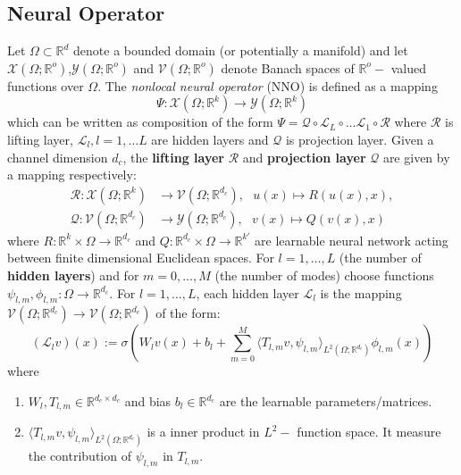 \documentclass[reqno,9pt]{amsart}
\theoremstyle{plain}
\theoremstyle{definition}
\newcommand{\bb}[1]{\mathbb{#1}}
\newcommand{\cal}[1]{\mathcal{#1}}
\begin{document}
\subsection{\bf Neural Operator}
Let $\Omega \subset \bb R^d$ denote a bounded domain (or potentially a manifold) and let $\cal X(\Omega;\bb R^o)$,$\cal Y(\Omega;\bb R^o)$ and $\cal V(\Omega;\bb R^o)$ denote Banach spaces of $\bb R^o-$ valued functions over $\Omega$. The {\it nonlocal neural operator} (NNO) is defined as a mapping 
$$ \Psi \colon \cal X(\Omega;\bb R^k) \to \cal Y(\Omega;\bb R^k)$$ 
which can be written as composition of the form $\Psi = \cal Q \circ \cal L_L \circ \dots \cal L_1 \circ \cal R$ where $\cal R$ is lifting layer, $\cal L_l, l = 1, \dots L$ are hidden layers and $\cal Q$ is projection layer. Given a channel dimension $d_c$, the {\bf lifting layer} $\cal R$ and {\bf projection layer} $\cal Q$ are given by a mapping respectively:
\begin{align}
    \cal R \colon \cal X(\Omega;\bb R^k) & \to \cal V(\Omega;\bb R^{d_c}),~~~ u(x) \mapsto R(u(x),x), \\
    \cal Q : \cal V(\Omega;\bb R^{d_c}) & \to \cal Y(\Omega;\bb R^{d_c}),~~~v(x) \mapsto Q(v(x),x)
\end{align}
where $R \colon \bb R^k \times \Omega \to \bb R^{d_c}$ and $Q : \bb R^{d_c} \times \Omega \to \bb R^{k'}$ are learnable neural network acting between finite dimensional Euclidean spaces. For $l = 1, \dots, L$ (the number of  {\bf hidden layers}) and for $m = 0, \dots, M$ (the number of modes) choose functions $\psi_{l,m},\phi_{l,m} \colon \Omega \to \bb R^{d_c}$. For $l = 1,\dots, L$, each hidden layer $\cal L_l$ is the mapping $\cal V(\Omega;\bb R^{d_c}) \to \cal V(\Omega;\bb R^{d_c})$ of the form:
$$ (\cal L_lv)(x) := \sigma\left(W_lv(x) + b_l + \sum_{m=0}^M \langle T_{l,m}v,\psi_{l,m}\rangle_{L^2(\Omega;\bb R^{d_c})}\phi_{l,m}(x)\right) $$
where
\begin{enumerate}
    \item $W_l,T_{l,m}\in \bb R^{d_c \times d_c}$ and bias $b_l \in \bb R^{d_c}$ are the learnable parameters/matrices.
    \item $\langle T_{l,m}v,\psi_{l,m}\rangle_{L^2(\Omega;\bb R^{d_c})}$ is a inner product in $L^2-$ function space. It measure the contribution of $\psi_{l,m}$ in $T_{l,m}$.
\end{enumerate}
\end{document}
